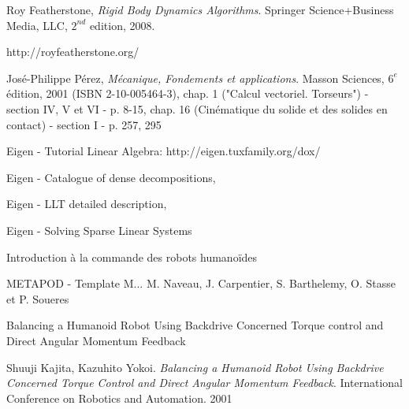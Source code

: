 
\begin{thebibliography}{9}

  Roy Featherstone,
  \emph{Rigid Body Dynamics Algorithms}.
  Springer Science+Business Media, LLC,
  $2^{nd}$ edition,
  2008.

  http://royfeatherstone.org/

  
  José-Philippe Pérez,
  \emph{Mécanique, Fondements et applications}.
  Masson Sciences,
  $6^{e}$ édition, 2001 (ISBN 2-10-005464-3),
  chap. 1 ("Calcul vectoriel. Torseurs") - section IV, V et VI - p. 8-15, 
  chap. 16 (Cinématique du solide et des solides en contact) - section I - p. 257, 295
  
  Eigen - Tutorial Linear Algebra:
  http://eigen.tuxfamily.org/dox/%
  
  Eigen - Catalogue of dense decompositions,
  
  Eigen - LLT detailed description,

  Eigen - Solving Sparse Linear Systems



  Introduction à la commande des robots humanoïdes
  
  METAPOD - Template M...
  M. Naveau, J. Carpentier, S. Barthelemy, O. Stasse et P. Soueres
  
  Balancing a Humanoid Robot Using Backdrive Concerned Torque control and Direct Angular Momentum Feedback
  
  Shuuji Kajita, Kazuhito Yokoi.
  \emph{Balancing a Humanoid Robot Using Backdrive Concerned Torque Control and Direct Angular Momentum Feedback}.
  International Conference on Robotics and Automation.
  2001


\end{thebibliography}
